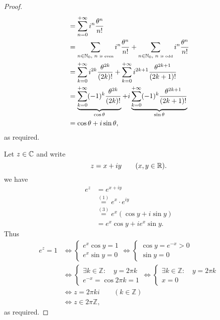 \begin{proof}
\begin{align*}
                    &= \sum_{n=0}^{+\infty} i^n \frac{\theta^n }{n!}
     \\
     &= 
     \sum_{n \in  \mathbb{N}_0, \text{ $n $ \tiny is even}  }^{} 
     i^n \frac{\theta^n }{n!} + 
     \sum_{n \in  \mathbb{N}_0, \text{ $n $ \tiny is odd}  }^{} 
     i^n \frac{\theta ^n }{n!} \\
     &= \sum_{k=0}^{ +\infty } i^{2k} \frac{\theta^{2k}}{(2k) !} + 
     \sum_{k=0}^{+\infty } i^{2k+1} \frac{\theta^{2k+1}}{(2k+1) !}
     \\
     &=
     \underbrace{
     \sum_{k=0}^{+\infty } 
     (-1) ^{k} \frac{\theta^{2k}}{(2k)! }
     }_{\cos \theta  }  + i 
     \underbrace{
     \sum_{k=0}^{+\infty } (-1) ^{k} \frac{\theta^{2k+1}}{(2k+1)! }}_{\sin \theta  } 
     \\
     &= \cos \theta + i \sin \theta,
     \end{align*}
     as required.
 \item[\ding{50} \ding{175}] Let $z \in  \mathbb{C}  $ and write
   \[
   z = x + iy \quad \quad (x, y \in  \mathbb{R}) .
   \]
   we have
   \begin{align*}
     e^{z} &= e^{x +  i y} 
        \\ & \overset{(1) }{=} e^{x} \cdot  e^{iy} \\
           & \overset{(3) }{=} e^{x}(\cos y + i \sin y    )  \\
           &= e^{x}\cos y + i e^{x} \sin  y.    
   \end{align*}
   Thus
   \begin{align*}
     e^{z } = 1 &\iff 
   \begin{cases}
   e^{x} \cos y = 1 \\
   e^{x} \sin  y = 0  
   \end{cases}
    \iff 
   \begin{cases}
   \cos y = e^{-x} > 0 \\
   \sin y = 0   
   \end{cases} \\
   & \iff 
   \begin{cases}
   \exists k \in   \mathbb{Z}: \quad y = 2 \pi  k \\
   e^{-x} = \cos 2 \pi  k  = 1   
   \end{cases} 
    \iff \begin{cases}
   \exists  k \in   \mathbb{Z}: \quad y = 2\pi  k \\
   x = 0 
   \end{cases} \\
   &\iff z = 2\pi  k i \quad \quad ( k \in  \mathbb{Z})  \\
   & \iff z \in   2 \pi  \mathbb{Z},
   \end{align*}
   as required.
\end{proof}
